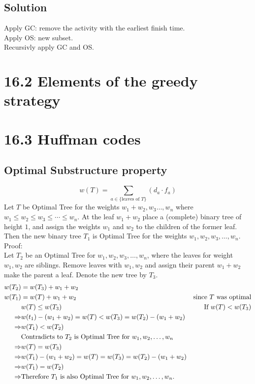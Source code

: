 \documentclass[a4paper]{article}
\begin{document}
\subsection*{Solution}
Apply GC: remove the activity with the earliest finish time.\\
Apply OS: new subset.\\
Recursivly apply GC and OS.

\section*{16.2 Elements of the greedy strategy}
\section*{16.3 Huffman codes}
\subsection*{Optimal Substructure property}
$$
w(T)=\sum_{a\in \{\text{leaves of }T\}}{(d_a \cdot f_a)}
$$
Let $T$ be Optimal Tree for the weights $w_1+w_2,w_3\ldots,w_n$ where $w_1\leq w_2\leq w_3\leq \cdots \leq w_n$. At the leaf $w_1+w_2$ place a (complete) binary tree of height $1$, and assign the weights $w_1$ and $w_2$ to the children of the former leaf. Then the new binary tree $T_1$ is Optimal Tree for the weights $w_1, w_2, w_3, \ldots , w_n$. \\

Proof:\\
Let $T_2$ be an Optimal Tree for $w_1, w_2, w_3, \ldots , w_n$, where the leaves for weight $w_1, w_2$ are siblings. Remove leaves with $w_1, w_2$ and assign their parent $w_1+w_2$ make the parent a leaf. Denote the new tree by $T_3$.
\begin{align*}
    w(T_2) &= w(T_3)+w_1+w_2\\
    w(T_1) &= w(T)+w_1+w_2&\hfill \text{since $T$ was optimal} \\
    &w(T)\leq w(T_3)&\hfill \text{If $w(T) < w(T_3)$}\\
    \Rightarrow &w(t_1)-(w_1+w_2)=w(T)<w(T_3)=w(T_2)-(w_1+w_2)\\
    \Rightarrow &w(T_1) < w(T_2)\\
    &\text{Contradicts to $T_2$ is Optimal Tree for $w_1,w_2,\ldots,w_n$}\\
    \Rightarrow &w(T)=w(T_3)\\
    \Rightarrow & w(T_1)-(w_1+w_2) = w(T)=w(T_3)=w(T_2)-(w_1+w_2)\\
    \Rightarrow&w(T_1)=w(T_2)\\
    \Rightarrow&\text{Therefore $T_1$ is also Optimal Tree for $w_1,w_2,\ldots, w_n$.}
\end{align*}
\end{document}
